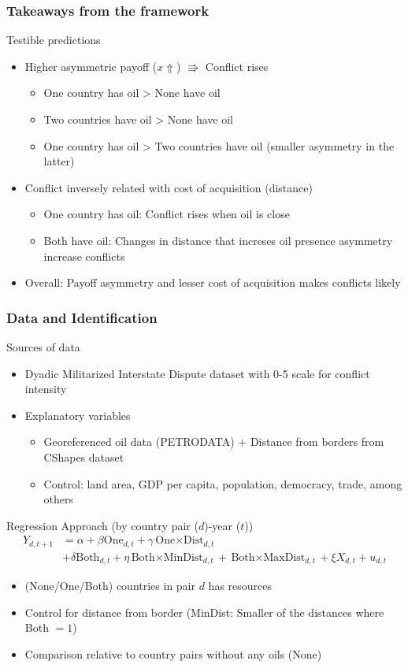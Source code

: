 \documentclass[aspectratio=169]{beamer}
\begin{document}
\begin{frame}
\frametitle{Takeaways from the framework} 
Testible predictions
\begin{itemize}\setlength\itemsep{3pt}
\item Higher asymmetric payoff ($x\Uparrow $) $\Rrightarrow$ Conflict rises
\begin{itemize}
\item One country has oil > None have oil
\item Two countries have oil > None have oil
\item One country has oil > Two countries have oil (smaller asymmetry in the latter)
\end{itemize} \medskip
\item Conflict inversely related with cost of acquisition (distance) 
\begin{itemize}
\item One country has oil: Conflict rises when oil is close
\item Both have oil: Changes in distance that increses oil presence asymmetry increase conflicts
\end{itemize} \medskip
\item Overall: Payoff asymmetry and lesser cost of acquisition makes conflicts likely
\end{itemize}
\end{frame}

\begin{frame}
\frametitle{Data and Identification} 
Sources of data
\begin{itemize}\setlength\itemsep{3pt}
\item Dyadic Militarized Interstate Dispute dataset with 0-5 scale for conflict intensity

\item Explanatory variables
\begin{itemize}
\item Georeferenced oil data (PETRODATA) $+$ Distance from borders from CShapes dataset
\item Control: land area, GDP per capita, population, democracy, trade, among others
\end{itemize}
\end{itemize} \medskip
Regression Approach (by country pair ($d$)-year ($t$))
\[
\begin{aligned}
Y_{d,t+1}&=\alpha+\beta\text{One}_{d,t}+\gamma{\text{One}\times\text{Dist}}_{d,t} \\ 
&+\delta\text{Both}_{d,t}+\eta{\text{Both}\times\text{MinDist}}_{d,t}+{\text{Both}\times\text{MaxDist}}_{d,t}+\xi X_{d,t}+u_{d,t}
\end{aligned}
\]
\begin{itemize}\setlength\itemsep{3pt}
\item (None/One/Both) countries in pair $d$ has resources
\item Control for distance from border (MinDist: Smaller of the distances where Both $=1$)
\item Comparison relative to country pairs without any oils (None)
 \end{itemize}
\end{frame}
\end{document}
